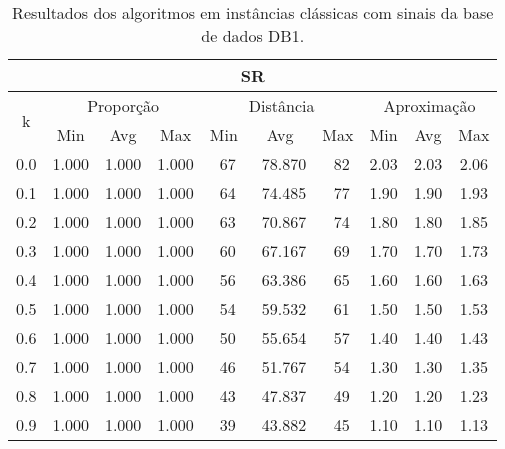 \begin{table}[!tbh]
\caption{Resultados dos algoritmos em instâncias clássicas com sinais da base de dados DB1.}
\label{table:CLTLBDUJ}
\begin{center}
\scriptsize
{\def\arraystretch{1.05}\tabcolsep=8pt
\begin{tabular}{|c|c|c|c|c|c|c|c|c|c|}
\hline
\multicolumn{10}{|c|}{\bf SR}                                                                                             \\ \hline
\multirow{2}{*}{k} & \multicolumn{3}{c|}{Proporção}  & \multicolumn{3}{c|}{Distância} & \multicolumn{3}{c|}{Aproximação}  \\ \cline{2-10}
                   & Min       & Avg      & Max      & Min      & Avg      & Max     & Min     & Avg    & Max             \\ \hline
0.0                & 1.000     & 1.000    & 1.000    & ~67      & ~78.870  & ~82     & 2.03    & 2.03   & 2.06            \\ \hline
0.1                & 1.000     & 1.000    & 1.000    & ~64      & ~74.485  & ~77     & 1.90    & 1.90   & 1.93            \\ \hline
0.2                & 1.000     & 1.000    & 1.000    & ~63      & ~70.867  & ~74     & 1.80    & 1.80   & 1.85            \\ \hline
0.3                & 1.000     & 1.000    & 1.000    & ~60      & ~67.167  & ~69     & 1.70    & 1.70   & 1.73            \\ \hline
0.4                & 1.000     & 1.000    & 1.000    & ~56      & ~63.386  & ~65     & 1.60    & 1.60   & 1.63            \\ \hline
0.5                & 1.000     & 1.000    & 1.000    & ~54      & ~59.532  & ~61     & 1.50    & 1.50   & 1.53            \\ \hline
0.6                & 1.000     & 1.000    & 1.000    & ~50      & ~55.654  & ~57     & 1.40    & 1.40   & 1.43            \\ \hline
0.7                & 1.000     & 1.000    & 1.000    & ~46      & ~51.767  & ~54     & 1.30    & 1.30   & 1.35            \\ \hline
0.8                & 1.000     & 1.000    & 1.000    & ~43      & ~47.837  & ~49     & 1.20    & 1.20   & 1.23            \\ \hline
0.9                & 1.000     & 1.000    & 1.000    & ~39      & ~43.882  & ~45     & 1.10    & 1.10   & 1.13            \\ \hline

\end{tabular}}
\end{center}
\end{table}

